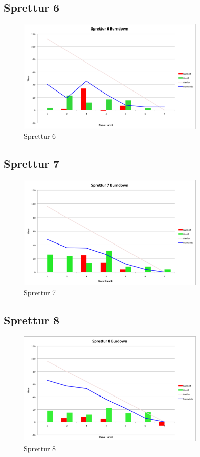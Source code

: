 \documentclass{article}
\begin{document}
\subsection{Sprettur 6}

\begin{figure}[H]
  \centering
  \includegraphics[width=0.8\textwidth]{Sprettur6_Burndown.png} 
  \caption{Sprettur 6} 
\end{figure}

\subsection{Sprettur 7}

\begin{figure}[H]
  \centering
  \includegraphics[width=0.8\textwidth]{Sprettur7_Burndown.png} 
  \caption{Sprettur 7} 
\end{figure}

\subsection{Sprettur 8}

\begin{figure}[H]
  \centering
  \includegraphics[width=0.8\textwidth]{Sprettur8_Burndown.png} 
  \caption{Sprettur 8} 
\end{figure}
\end{document}
